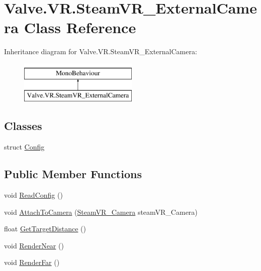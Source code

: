\hypertarget{class_valve_1_1_v_r_1_1_steam_v_r___external_camera}{}\section{Valve.\+V\+R.\+Steam\+V\+R\+\_\+\+External\+Camera Class Reference}
\label{class_valve_1_1_v_r_1_1_steam_v_r___external_camera}
Inheritance diagram for Valve.\+V\+R.\+Steam\+V\+R\+\_\+\+External\+Camera\+:\begin{figure}[H]
\begin{center}
\leavevmode
\includegraphics[height=2.000000cm]{class_valve_1_1_v_r_1_1_steam_v_r___external_camera}
\end{center}
\end{figure}
\subsection*{Classes}
\begin{DoxyCompactItemize}
\item 
struct \mbox{\hyperlink{struct_valve_1_1_v_r_1_1_steam_v_r___external_camera_1_1_config}{Config}}
\end{DoxyCompactItemize}
\subsection*{Public Member Functions}
\begin{DoxyCompactItemize}
\item 
void \mbox{\hyperlink{class_valve_1_1_v_r_1_1_steam_v_r___external_camera_ad7cf6593d79e674294e5a8c47a7589e5}{Read\+Config}} ()
\item 
void \mbox{\hyperlink{class_valve_1_1_v_r_1_1_steam_v_r___external_camera_a9543c9deb4f7e3ac929dc2e5fa4064c6}{Attach\+To\+Camera}} (\mbox{\hyperlink{class_valve_1_1_v_r_1_1_steam_v_r___camera}{Steam\+V\+R\+\_\+\+Camera}} steam\+V\+R\+\_\+\+Camera)
\item 
float \mbox{\hyperlink{class_valve_1_1_v_r_1_1_steam_v_r___external_camera_a46f18bd38fbfbed8ea67bfe706f5e82a}{Get\+Target\+Distance}} ()
\item 
void \mbox{\hyperlink{class_valve_1_1_v_r_1_1_steam_v_r___external_camera_acd7554ee85545ac5dd5fda38ecc653b6}{Render\+Near}} ()
\item 
void \mbox{\hyperlink{class_valve_1_1_v_r_1_1_steam_v_r___external_camera_a18c262f33f101852d9d549894059b018}{Render\+Far}} ()
\end{DoxyCompactItemize}
